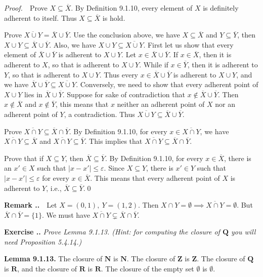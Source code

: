 \documentclass{book}
\newcommand{\pff}{\vspace{.25em}\noindent\emph{Proof.}~~}
\newcommand{\remark}{\vspace{.5em}\noindent\textbf{Remark \textbf{\theExercise}}~~}
\newcommand{\titl}[1]{\noindent\textbf{#1}}
\newcounter{Exercise}[section]
\renewcommand{\theExercise}{\thesection.\arabic{Exercise}.}
\newcommand{\new}{\vspace{1.5em}\noindent\textbf{{Exercise \stepcounter{Exercise}\textbf{\theExercise}}} }
\begin{document}
\pff Prove $X\subseteq\overline X$. By Definition 9.1.10, every element of $X$ is definitely adherent to itself. Thus $X\subseteq\overline X$ is hold.

Prove $\overline{X\cup Y}=\overline X\cup\overline Y$. Use the conclusion above, we have $X\subseteq\overline X$ and $Y\subseteq\overline Y$, then $X\cup Y\subseteq\overline X\cup\overline Y$. Also, we have $X\cup Y\subseteq\overline{X\cup Y}$. First let us show that every element of $\overline X\cup\overline Y$ is adherent to $X\cup Y$. Let $x\in\overline X\cup\overline Y$. If $x\in\overline X$, then it is adherent to $X$, so that is adherent to $X\cup Y$. While if $x\in\overline Y$, then it is adherent to $Y$, so that is adherent to $X\cup Y$. Thus every $x\in\overline X\cup\overline Y$ is adherent to $X\cup Y$, and we have $\overline X\cup\overline Y\subseteq\overline{X\cup Y}$. Conversely, we need to show that every adherent point of $X\cup Y$ lies in $\overline X\cup\overline Y$. Suppose for sake of contradiction that $x\notin\overline X\cup\overline Y$. Then $x\notin\overline X$ and $x\notin\overline Y$, this means that $x$ neither an adherent point of $X$ nor an adherent point of $Y$, a contradiction. Thus $\overline{X\cup Y}\subseteq\overline X\cup\overline Y$.

Prove $\overline{X\cap Y}\subseteq\overline X\cap\overline Y$. By Definition 9.1.10, for every $x\in\overline{X\cap Y}$, we have $\overline{X\cap Y}\subseteq\overline X$ and $\overline{X\cap Y}\subseteq\overline Y$. This implies that $\overline{X\cap Y}\subseteq\overline X\cap\overline Y$.

Prove that if $X\subseteq Y$, then $\overline X\subseteq \overline Y$. By Definition 9.1.10, for every $x\in\overline X$, there is an $x'\in X$ such that $|x-x'|\leq\varepsilon$. Since $X\subseteq Y$, there is $x'\in Y$ such that $|x-x'|\leq\varepsilon$ for every $x\in\overline X$. This means that every adherent point of $X$ is adherent to $Y$, i.e., $\overline X\subseteq\overline Y$.\qed

\remark Let $X=(0,1),~Y=(1,2)$. Then $X\cap Y=\emptyset\implies\overline{X\cap Y}=\emptyset$. But $\overline X\cap\overline Y=\{1\}$. We must have $\overline{X\cap Y}\subsetneq\overline X\cap\overline Y$.

\new\emph{Prove Lemma 9.1.13. (Hint: for computing the closure of $\mathbf{Q}$ you will need Proposition 5.4.14.)}

\begin{framed}
\titl{Lemma 9.1.13.} The closure of $\mathbf{N}$ is $\mathbf{N}$. The closure of $\mathbf{Z}$ is $\mathbf{Z}$. The closure of $\mathbf{Q}$ is $\mathbf{R}$, and the closure of $\mathbf{R}$ is $\mathbf{R}$. The closure of the empty set $\emptyset$ is $\emptyset$.
\end{framed}
\end{document}
